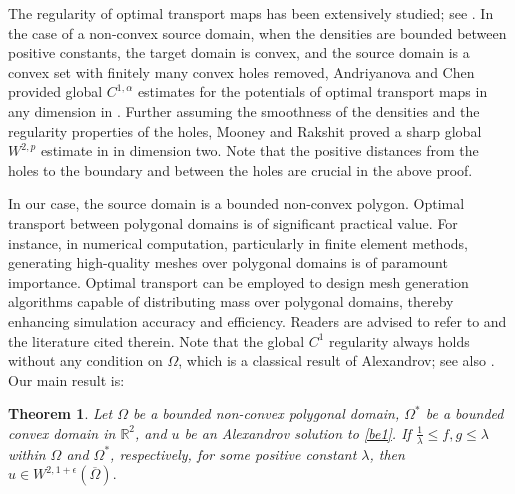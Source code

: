 \documentclass[11pt]{amsart}
\theoremstyle{plain}
\newtheorem{theorem}{Theorem}[section]
\newcommand{\0}{\textbf{0}}
\numberwithin{equation}{section}
\numberwithin{equation}{section}
\numberwithin{figure}{section}
\begin{document}
	
	
	
	The regularity of optimal transport maps has been extensively studied; see \cite{C92, C92b, C96, CL2, CLW1, CLW2, U1}. In the case of a non-convex source domain, when the densities are bounded between positive constants, the target domain is convex, and the source domain is a convex set with finitely many convex holes removed, Andriyanova and Chen provided global $C^{1,\alpha}$ estimates for the potentials of optimal transport maps in any dimension in \cite{AC}. Further assuming the smoothness of the densities and the regularity properties of the holes, Mooney and Rakshit proved a sharp global $W^{2,p}$ estimate in \cite{CR} in dimension two. Note that the positive distances from the holes to the boundary and between the holes are crucial in the above proof. 
	
	In our case, the source domain is a bounded non-convex polygon. Optimal transport between polygonal domains is of significant practical value. For instance, in numerical computation, particularly in finite element methods, generating high-quality meshes over polygonal domains is of paramount importance. Optimal transport can be employed to design mesh generation algorithms capable of distributing mass over polygonal domains, thereby enhancing simulation accuracy and efficiency. Readers are advised to refer to \cite{Levy,Mer} and the literature cited therein. Note that the global $C^1$ regularity always holds without any condition on $\Omega$, which is a classical result of Alexandrov; see also \cite{Fig4}. Our main result is:
	
	\begin{theorem}\label{t1}
		Let $\Omega$ be a bounded non-convex polygonal domain, $\Omega^*$ be a bounded convex domain in $\mathbb{R}^2$, and $u$ be an Alexandrov solution to \eqref{be1}. If $\frac{1}{\lambda} \leq f, g \leq \lambda$ within $\Omega$ and $\Omega^*$, respectively, for some positive constant $\lambda$, then $u\in W^{2, 1+\epsilon}(\overline{\Omega}).$
	\end{theorem}
	
\end{document}
